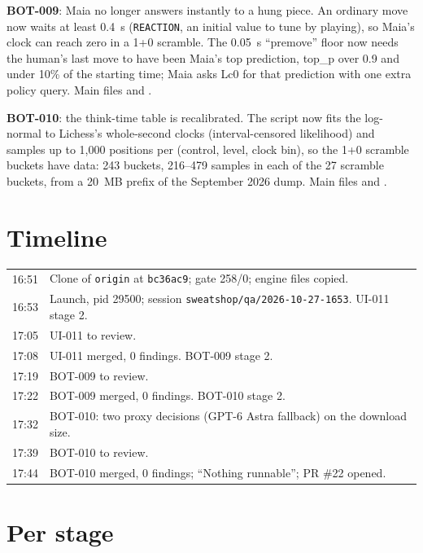 \documentclass[11pt,a4paper]{article}
\begin{document}
\textbf{BOT-009}: Maia no longer answers instantly to a hung piece. An ordinary move now waits at
least 0.4~s (\texttt{REACTION}, an initial value to tune by playing), so Maia's clock can reach
zero in a 1+0 scramble. The 0.05~s ``premove'' floor now needs the human's last move to have
been Maia's top prediction, top\_p over 0.9 and under 10\% of the starting time; Maia asks
Lc0 for that prediction with one extra policy query. Main files  and
.

\textbf{BOT-010}: the think-time table is recalibrated. The script now fits the log-normal to
Lichess's whole-second clocks (interval-censored likelihood) and samples up to 1,000 positions
per (control, level, clock bin), so the 1+0 scramble buckets have data: 243 buckets, 216--479
samples in each of the 27 scramble buckets, from a 20~MB prefix of the September 2026 dump.
Main files  and .

\section*{Timeline}

\begin{tabularx}{\linewidth}{@{}lX@{}}
\toprule
16:51 & Clone of \texttt{origin} at \texttt{bc36ac9}; gate 258/0; engine files copied. \\
16:53 & Launch, pid 29500; session \texttt{sweatshop/qa/2026-10-27-1653}. UI-011 stage 2. \\
17:05 & UI-011 to review. \\
17:08 & UI-011 merged, 0 findings. BOT-009 stage 2. \\
17:19 & BOT-009 to review. \\
17:22 & BOT-009 merged, 0 findings. BOT-010 stage 2. \\
17:32 & BOT-010: two proxy decisions (GPT-6 Astra fallback) on the download size. \\
17:39 & BOT-010 to review. \\
17:44 & BOT-010 merged, 0 findings; ``Nothing runnable''; PR \#22 opened. \\
\bottomrule
\end{tabularx}

\section*{Per stage}
\end{document}

